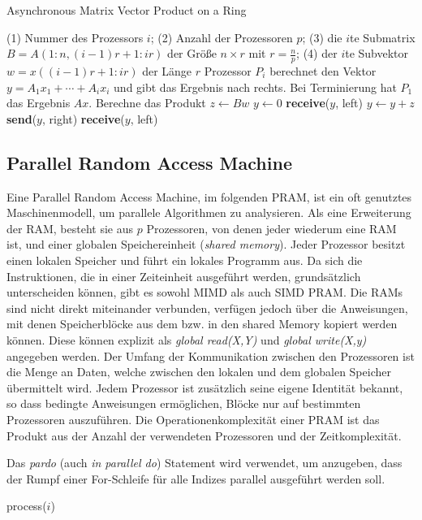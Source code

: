 \begin{algorithm}
    \caption{Asynchronous Matrix Vector Product on a Ring \cite[S.18]{jaja}}
    \begin{algorithmic}[1]
    \Require (1) Nummer des Prozessors $i$; (2) Anzahl der Prozessoren $p$;
    (3) die $i$te Submatrix $B = A(1:n, (i-1)r+1:ir)$ der Größe $n \times r$
        mit $r = \frac{n}{p}$;
    (4) der $i$te Subvektor $w = x((i-1)r+1:ir)$ der Länge $r$
    \Ensure Prozessor $P_i$ berechnet den Vektor $y = A_1x_1 + \cdots + A_ix_i$
    und gibt das Ergebnis nach rechts. Bei Terminierung hat $P_1$ das
    Ergebnis $Ax$.
    \State Berechne das Produkt $z \gets Bw$
        \State $y \gets 0$
    \Else
        \State \textbf{receive}($y$, left)
    \EndIf
    \State $y \gets y + z$
    \State \textbf{send}($y$, right)
        \State \textbf{receive}($y$, left)
    \EndIf
    \end{algorithmic}
\end{algorithm}


\subsection{Parallel Random Access Machine}
Eine Parallel Random Access Machine, im folgenden PRAM, ist ein oft genutztes
Maschinenmodell, um parallele Algorithmen zu analysieren.
Als eine Erweiterung der RAM, besteht sie aus $p$ Prozessoren, von denen jeder
wiederum eine RAM ist, und einer globalen Speichereinheit
(\emph{shared memory}).
Jeder Prozessor besitzt einen lokalen Speicher und führt ein lokales Programm
aus.
Da sich die Instruktionen, die in einer Zeiteinheit ausgeführt werden,
grundsätzlich unterscheiden können, gibt es sowohl MIMD als auch SIMD PRAM.
Die RAMs sind nicht direkt miteinander verbunden, verfügen jedoch über die
Anweisungen, mit denen Speicherblöcke aus dem bzw. in den shared Memory kopiert
werden können.
Diese können explizit als \emph{global read(X,Y)} und \emph{global write(X,y)}
angegeben werden.
Der Umfang der Kommunikation zwischen den Prozessoren ist die Menge an Daten,
welche zwischen den lokalen und dem globalen Speicher übermittelt wird.
Jedem Prozessor ist zusätzlich seine eigene Identität bekannt, so dass bedingte
Anweisungen ermöglichen, Blöcke nur auf bestimmten Prozessoren auszuführen.
Die Operationenkomplexität einer PRAM ist das Produkt aus der Anzahl der
verwendeten Prozessoren und der Zeitkomplexität.
\cite[S.9ff.]{jaja}

Das \emph{pardo} (auch \emph{in parallel do}) Statement wird verwendet, um
anzugeben, dass der Rumpf einer For-Schleife für alle Indizes parallel
ausgeführt werden soll.
\begin{algorithmic}
        \State process($i$)
    \EndParDo
\end{algorithmic}


